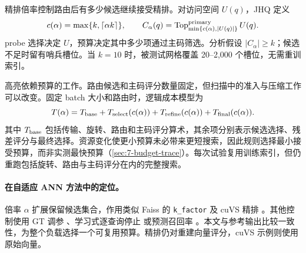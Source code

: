 精排倍率控制路由后有多少候选继续接受精排。对访问空间 $U(q)$，JHQ 定义 \cite{jhq}
\begin{equation}
 c(\alpha)=\max\{k,\lceil\alpha k\rceil\},\qquad
 C_\alpha(q)=\operatorname{Top}^{\rm primary}_{\min\{c(\alpha),|U(q)|\}}U(q).
 \label{eq:6-budget}
\end{equation}
probe 选择决定 $U$，预算决定其中多少项通过主码筛选。分析假设 $|C_\alpha|\geq k$；候选不足时留有哨兵槽位。当 $k=10$ 时，被测试网格覆盖 20--2,000 个槽位，无需重训索引。

 高亮依赖预算的工作。路由候选和主码评分数量固定，但扫描中的准入与压缩工作可以改变。固定 batch 大小和路由时，逻辑成本模型为
\begin{equation}
 T(\alpha)=T_{\rm base}+T_{\rm select}(c(\alpha))+
 T_{\rm refine}(c(\alpha))+T_{\rm final}(c(\alpha)).
 \label{eq:6-cost-model}
\end{equation}
其中 $T_{\rm base}$ 包括传输、旋转、路由和主码评分算术，其余项分别表示候选选择、残差评分与最终选择。资源变化使更小预算未必带来更短搜索，因此规则选择最小接受预算，而非实测最快预算（\cref{sec:7-budget-trace}）。每次试验复用训练索引，但仍重跑包括旋转、路由与主码评分在内的完整搜索。

\paragraph{在自适应 ANN 方法中的定位。}
倍率 $\alpha$ 扩展保留候选集合，作用类似 Faiss 的 \texttt{k\_factor} 及 cuVS 精排 \cite{faiss_refine,cuvs_refinement}。其他控制使用 GT 调参 \cite{faiss_autotune}、学习式逐查询停止 \cite{li_termination} 或预测召回率 \cite{darth}。本文与参考输出比较一致性，为整个负载选择一个可复用预算。精排仍对重建向量评分，cuVS 示例则使用原始向量。
